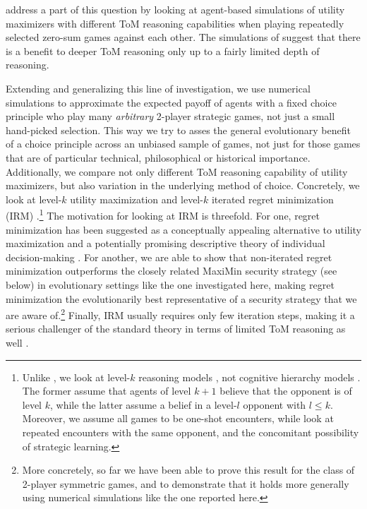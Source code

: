 \documentclass[10pt]{article}
\begin{document}
\citet{Weerdde-WeerdVerbrugge2013:How-much-does-i} address a part of
this question by looking at agent-based simulations of utility
maximizers with different ToM reasoning capabilities when playing
repeatedly selected zero-sum games against each other. The simulations
of \citeauthor{Weerdde-WeerdVerbrugge2013:How-much-does-i} suggest
that there is a benefit to deeper ToM reasoning only up to a fairly
limited depth of reasoning. 

Extending and generalizing this line of investigation, we use
numerical simulations to approximate the expected payoff of agents
with a fixed choice principle who play many \emph{arbitrary} 2-player
strategic games, not just a small hand-picked selection. This way we
try to asses the general evolutionary benefit of a choice principle
across an unbiased sample of games, not just for those games that are
of particular technical, philosophical or historical
importance. Additionally, we compare not only different ToM reasoning
capability of utility maximizers, but also variation in the underlying
method of choice. Concretely, we look at level-$k$ utility
maximization and level-$k$ iterated regret minimization (IRM)
\citep{HalpernPass2012:Iterated-Regret}.\footnote{Unlike
  \citeauthor{Weerdde-WeerdVerbrugge2013:How-much-does-i}, we look at
  level-$k$ reasoning models
  \citep[e.g.][]{Crawford2003:Lying-for-Strat,Crawford2007:Lets-Talk-It-Ove},
  not cognitive hierarchy models
  \citep[e.g.][]{CamererHo2004:A-Cognitive-Hie}. The former assume
  that agents of level $k+1$ believe that the opponent is of level
  $k$, while the latter assume a belief in a level-$l$ opponent with
  $l \le k$. Moreover, we assume all games to be one-shot encounters,
  while \citeauthor{Weerdde-WeerdVerbrugge2013:How-much-does-i} look
  at repeated encounters with the same opponent, and the concomitant
  possibility of strategic learning.}  The motivation for looking at
IRM is threefold. For one, regret minimization has been suggested as a
conceptually appealing alternative to utility maximization and a
potentially promising descriptive theory of individual decision-making
\citep{LoomesSugden1982:Regret-Theory:-}. For another, we are able to
show that non-iterated regret minimization outperforms the closely
related MaxiMin security strategy (see below) in evolutionary settings
like the one investigated here, making regret minimization the
evolutionarily best representative of a security strategy that we are
aware of.\footnote{More concretely, so far we have been able to prove
  this result for the class of 2-player symmetric games, and to
  demonstrate that it holds more generally using numerical simulations
  like the one reported here.} Finally, IRM usually requires only few
iteration steps, making it a serious challenger of the standard theory
in terms of limited ToM reasoning as well
\citep[c.f.][]{HalpernPass2012:Iterated-Regret}.
\end{document}
